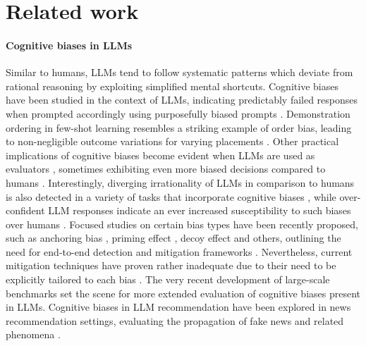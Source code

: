 \section{Related work}
\label{sec:related}
\paragraph{Cognitive biases in LLMs} Similar to humans, LLMs tend to follow systematic patterns which deviate from rational reasoning by exploiting simplified mental shortcuts. Cognitive biases have been studied in the context of LLMs, indicating predictably failed responses when prompted accordingly using purposefully biased prompts \cite{human-cognitive}. Demonstration ordering in few-shot learning resembles a striking example of order bias, leading to non-negligible outcome variations for varying placements \cite{lu-etal-2022-fantastically, dong-etal-2024-survey}.
Other practical implications of cognitive biases become evident when LLMs are used as evaluators \cite{ye2024justiceprejudicequantifyingbiases, koo-etal-2024-benchmarking}, sometimes exhibiting even more biased decisions compared to humans \cite{koo-etal-2024-benchmarking}. Interestingly, diverging irrationality of LLMs in comparison to humans is also detected in a variety of tasks that incorporate cognitive biases \cite{macmillanscott2024irrationalitycognitivebiaseslarge}, while over-confident LLM responses indicate an ever increased susceptibility to such biases over humans \cite{castello-etal-2024-examining}.
Focused studies on certain bias types have been recently proposed, such as anchoring bias \cite{lou2024anchoringbiaslargelanguage}, priming effect \cite{chen2024aicognitivelybiasedexploratory}, decoy effect \cite{liu2024decoydilemmaonlinemedical} and others, outlining the need for end-to-end detection and mitigation frameworks \cite{echterhoff-etal-2024-cognitive}. Nevertheless, current mitigation techniques have proven rather inadequate due to their need to be explicitly tailored to each bias \cite{sumita2024cognitivebiaseslargelanguage}. The very recent development of large-scale benchmarks \cite{malberg2024comprehensiveevaluationcognitivebiases} set the scene for more extended evaluation of cognitive biases present in LLMs. 
Cognitive biases in LLM recommendation have been explored in news recommendation settings, evaluating the propagation of fake news and related phenomena \cite{lyu2024cognitivebiaseslargelanguage}.

 

